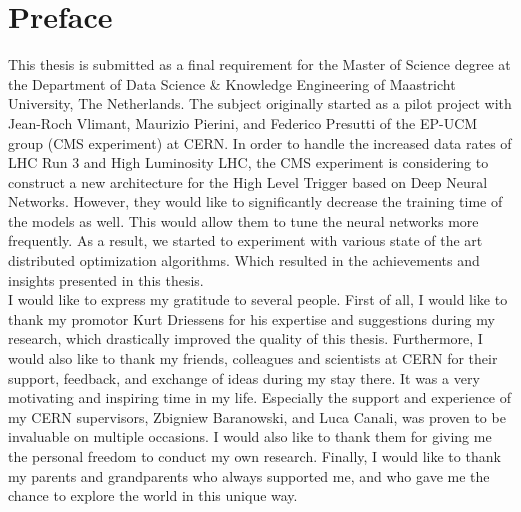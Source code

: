 %
%
%

\newpage
\chapter*{Preface}

This thesis is submitted as a final requirement for the Master of Science degree at the Department of Data Science \& Knowledge Engineering of Maastricht University, The Netherlands. The subject originally started as a pilot project with Jean-Roch Vlimant, Maurizio Pierini, and Federico Presutti of the EP-UCM group (CMS experiment) at CERN. In order to handle the increased data rates of LHC Run 3 and High Luminosity LHC, the CMS experiment is considering to construct a new architecture for the High Level Trigger based on Deep Neural Networks. However, they would like to significantly decrease the training time of the models as well. This would allow them to tune the neural networks more frequently. As a result, we started to experiment with various state of the art distributed optimization algorithms. Which resulted in the achievements and insights presented in this thesis.\\

I would like to express my gratitude to several people. First of all, I would like to thank my promotor Kurt Driessens for his expertise and suggestions during my research, which drastically improved the quality of this thesis. Furthermore, I would also like to thank my friends, colleagues and scientists at CERN for their support, feedback, and exchange of ideas during my stay there. It was a very motivating and inspiring time in my life. Especially the support and experience of my CERN supervisors, Zbigniew Baranowski, and Luca Canali, was proven to be invaluable on multiple occasions. I would also like to thank them for giving me the personal freedom to conduct my own research. Finally, I would like to thank my parents and grandparents who always supported me, and who gave me the chance to explore the world in this unique way.
